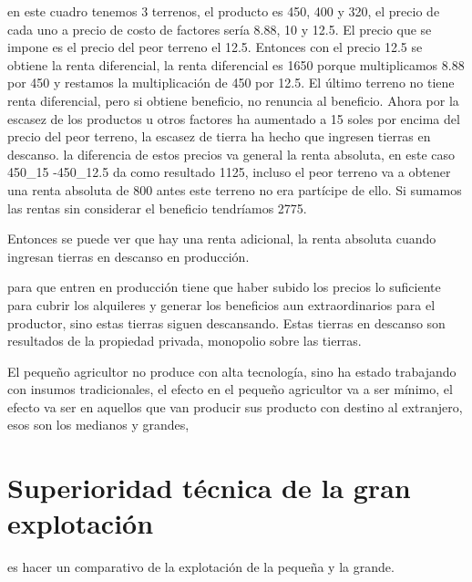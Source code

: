 \documentclass[
  letterpaper,
  DIV=11,
  numbers=noendperiod]{scrartcl}
\begin{document}
en este cuadro tenemos 3 terrenos, el producto es 450, 400 y 320, el
precio de cada uno a precio de costo de factores sería 8.88, 10 y 12.5.
El precio que se impone es el precio del peor terreno el 12.5. Entonces
con el precio 12.5 se obtiene la renta diferencial, la renta diferencial
es 1650 porque multiplicamos 8.88 por 450 y restamos la multiplicación
de 450 por 12.5. El último terreno no tiene renta diferencial, pero si
obtiene beneficio, no renuncia al beneficio. Ahora por la escasez de los
productos u otros factores ha aumentado a 15 soles por encima del precio
del peor terreno, la escasez de tierra ha hecho que ingresen tierras en
descanso. la diferencia de estos precios va general la renta absoluta,
en este caso 450\_15 -450\_12.5 da como resultado 1125, incluso el peor
terreno va a obtener una renta absoluta de 800 antes este terreno no era
partícipe de ello. Si sumamos las rentas sin considerar el beneficio
tendríamos 2775.

Entonces se puede ver que hay una renta adicional, la renta absoluta
cuando ingresan tierras en descanso en producción.

para que entren en producción tiene que haber subido los precios lo
suficiente para cubrir los alquileres y generar los beneficios aun
extraordinarios para el productor, sino estas tierras siguen
descansando. Estas tierras en descanso son resultados de la propiedad
privada, monopolio sobre las tierras.

El pequeño agricultor no produce con alta tecnología, sino ha estado
trabajando con insumos tradicionales, el efecto en el pequeño agricultor
va a ser mínimo, el efecto va ser en aquellos que van producir sus
producto con destino al extranjero, esos son los medianos y grandes,

\hypertarget{superioridad-tuxe9cnica-de-la-gran-explotaciuxf3n-1}{%
\section{Superioridad técnica de la gran
explotación}\label{superioridad-tuxe9cnica-de-la-gran-explotaciuxf3n-1}}

es hacer un comparativo de la explotación de la pequeña y la grande.
\end{document}
